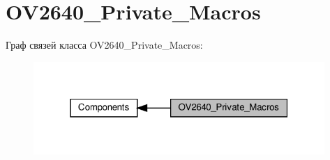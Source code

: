 \hypertarget{group___o_v2640___private___macros}{}\section{O\+V2640\+\_\+\+Private\+\_\+\+Macros}
\label{group___o_v2640___private___macros}
Граф связей класса O\+V2640\+\_\+\+Private\+\_\+\+Macros\+:
\nopagebreak
\begin{figure}[H]
\begin{center}
\leavevmode
\includegraphics[width=313pt]{group___o_v2640___private___macros}
\end{center}
\end{figure}

